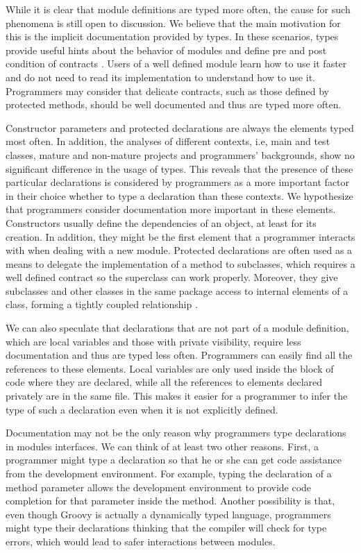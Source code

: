 \documentclass[]{sigplanconf}
\begin{document}
While it is clear that module definitions are typed more often, the cause for such phenomena is still open to discussion.
We believe that the main motivation for this is the implicit documentation provided by types.
In these scenarios, types provide useful hints about the behavior of modules \cite{Curtis1987} and define pre and post condition of contracts
\cite{Meyer88, Meijer04, Wadler04, Plosch97, Flanagan2006, Furr09}.
Users of a well defined module learn how to use it faster and do not need to read its implementation to understand how to use it.
Programmers may consider that delicate contracts, such as those defined by protected methods, should be well documented and thus are typed more often.

Constructor parameters and protected declarations are always the elements typed most often.
In addition, the analyses of different contexts, i.e, main and test classes, mature and non-mature projects and programmers' backgrounds, show no significant difference in the usage of types.
This reveals that the presence of these particular declarations is considered by programmers as a more important factor in their choice whether to type a declaration than these contexts.
We hypothesize that programmers consider documentation more important in these elements.
Constructors usually define the dependencies of an object, at least for its creation.
In addition, they might be the first element that a programmer interacts with when dealing with a new module.
Protected declarations are often used as a means to delegate the implementation of a method to subclasses, which requires a well defined contract so the superclass can work properly.
Moreover, they give subclasses and other classes in the same package access to internal elements of a class, forming a tightly coupled relationship \cite{Chidamber94}.


We can also speculate that declarations that are not part of a module definition, which are local variables and those with private visibility, require less documentation and thus are typed less often.
Programmers can easily find all the references to these elements.
Local variables are only used inside the block of code where they are declared, while all the references to elements declared privately are in the same file.
This makes it easier for a programmer to infer the type of such a declaration even when it is not explicitly defined.

Documentation may not be the only reason why programmers type declarations in modules interfaces.
We can think of at least two other reasons.
First, a programmer might type a declaration so that he or she can get code assistance from the development environment.
For example, typing the declaration of a method parameter allows the development environment to provide code completion for that parameter inside the method.
Another possibility is that, even though Groovy is actually a dynamically typed language, programmers might type their declarations thinking that the compiler will check for type errors, which would lead to safer interactions between modules.
\end{document}
